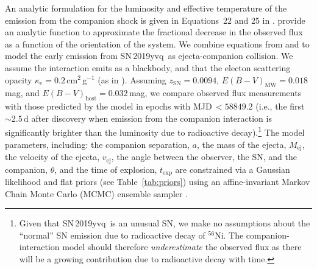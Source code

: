 \documentclass[twocolumn]{aastex63}
\newcommand{\radni}{$^{56}$Ni}
\newcommand{\sn}{SN\,2019yvq}
\begin{document}
An analytic formulation for the luminosity and effective temperature of the
emission from the companion shock is given in Equations~22 and 25 in
\citet{Kasen10a}. \citet{Brown12} provide an analytic function to approximate
the fractional decrease in the observed flux as a function of the orientation
of the system. We combine equations from \citet{Kasen10a} and \citet{Brown12}
to model the early emission from \sn\ as ejecta-companion collision. We assume
the interaction emits as a blackbody, and that the electon scattering opacity
$\kappa_e = 0.2$\,cm$^{2}$\,g$^{-1}$ (as in \citealt{Kasen10a}). Assuming
$z_\mathrm{SN} = 0.0094$, $E(B-V)_\mathrm{MW} = 0.018$\,mag, and
$E(B-V)_\mathrm{host} = 0.032$\,mag, we compare observed flux measurements
with those predicted by the \citet{Kasen10a} model in epochs with MJD$\,<
58849.2$ (i.e., the first $\sim$2.5\,d after discovery when emission from the
companion interaction is significantly brighter than the luminosity due to
radioactive decay).\footnote{Given that \sn\ is an unusual SN, we make no
assumptions about the ``normal'' SN emission due to radioactive decay of
\radni. The companion-interaction model should therefore
\textit{underestimate} the observed flux as there will be a growing
contribution due to radioactive decay with time.} The model parameters,
including: the companion separation, $a$, the mass of the ejecta,
$M_\mathrm{ej}$, the velocity of the ejecta, $v_\mathrm{ej}$, the angle
between the observer, the SN, and the companion, $\theta$, and the time of
explosion, $t_\mathrm{exp}$ are constrained via a Gaussian likelihood and flat
priors (see Table~\ref{tab:priors}) using an affine-invariant
\citep{Goodman10} Markov Chain Monte Carlo (MCMC) ensemble sampler
\citep{Foreman-Mackey13}.
\end{document}
